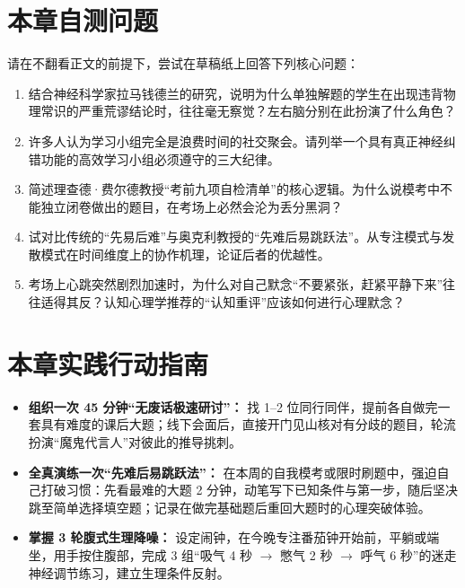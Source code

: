 \documentclass[12pt,a4paper,openany]{ctexbook}
\begin{document}
\section*{本章自测问题}
请在不翻看正文的前提下，尝试在草稿纸上回答下列核心问题：
\begin{enumerate}
    \item 结合神经科学家拉马钱德兰的研究，说明为什么单独解题的学生在出现违背物理常识的严重荒谬结论时，往往毫无察觉？左右脑分别在此扮演了什么角色？
    \item 许多人认为学习小组完全是浪费时间的社交聚会。请列举一个具有真正神经纠错功能的高效学习小组必须遵守的三大纪律。
    \item 简述理查德·费尔德教授“考前九项自检清单”的核心逻辑。为什么说模考中不能独立闭卷做出的题目，在考场上必然会沦为丢分黑洞？
    \item 试对比传统的“先易后难”与奥克利教授的“先难后易跳跃法”。从专注模式与发散模式在时间维度上的协作机理，论证后者的优越性。
    \item 考场上心跳突然剧烈加速时，为什么对自己默念“不要紧张，赶紧平静下来”往往适得其反？认知心理学推荐的“认知重评”应该如何进行心理默念？
\end{enumerate}

\section*{本章实践行动指南}
\begin{practicebox}[本周应试与纠错演练清单]
\begin{itemize}
    \item[$\square$] \textbf{组织一次 45 分钟“无废话极速研讨”：} 找 1--2 位同行同伴，提前各自做完一套具有难度的课后大题；线下会面后，直接开门见山核对有分歧的题目，轮流扮演“魔鬼代言人”对彼此的推导挑刺。
    \item[$\square$] \textbf{全真演练一次“先难后易跳跃法”：} 在本周的自我模考或限时刷题中，强迫自己打破习惯：先看最难的大题 2 分钟，动笔写下已知条件与第一步，随后坚决跳至简单选择填空题；记录在做完基础题后重回大题时的心理突破体验。
    \item[$\square$] \textbf{掌握 3 轮腹式生理降噪：} 设定闹钟，在今晚专注番茄钟开始前，平躺或端坐，用手按住腹部，完成 3 组“吸气 4 秒 $\rightarrow$ 憋气 2 秒 $\rightarrow$ 呼气 6 秒”的迷走神经调节练习，建立生理条件反射。
\end{itemize}
\end{practicebox}
\end{document}
